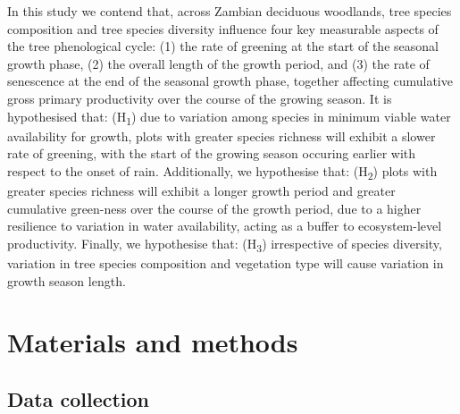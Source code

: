 \documentclass[11pt,a4paper]{article}
\begin{document}
In this study we contend that, across Zambian deciduous woodlands, tree species composition and tree species diversity influence four key measurable aspects of the tree phenological cycle: (1) the rate of greening at the start of the seasonal growth phase, (2) the overall length of the growth period, and (3) the rate of senescence at the end of the seasonal growth phase, together affecting cumulative gross primary productivity over the course of the growing season. It is hypothesised that: (H\textsubscript{1}) due to variation among species in minimum viable water availability for growth, plots with greater species richness will exhibit a slower rate of greening, with the start of the growing season occuring earlier with respect to the onset of rain. Additionally, we hypothesise that: (H\textsubscript{2}) plots with greater species richness will exhibit a longer growth period and greater cumulative green-ness over the course of the growth period, due to a higher resilience to variation in water availability, acting as a buffer to ecosystem-level productivity. Finally, we hypothesise that: (H\textsubscript{3}) irrespective of species diversity, variation in tree species composition and vegetation type will cause variation in growth season length. 

\section{Materials and methods}

\subsection{Data collection}
\end{document}
